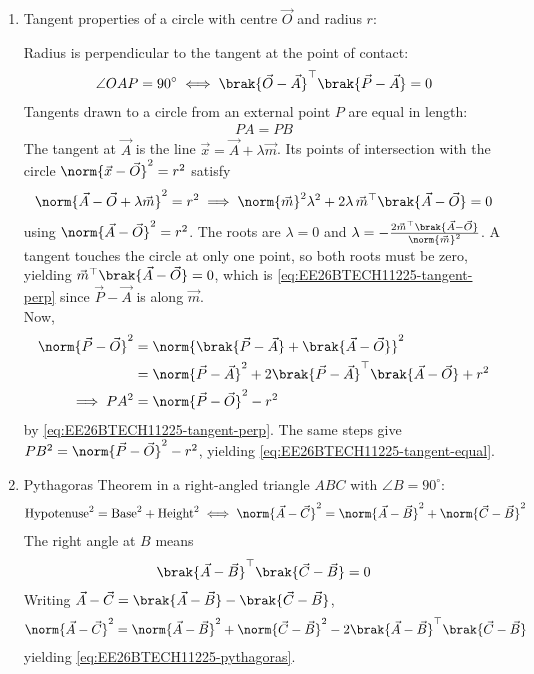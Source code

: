 \begin{enumerate}[label=\thesubsection.\arabic*, ref=\thesubsection.\theenumi]
\item Tangent properties of a circle with centre $\vec{O}$ and radius $r$:
\begin{center}
	
\end{center}
Radius is perpendicular to the tangent at the point of contact:
\begin{align}
	\angle OAP = 90^\circ
	\iff \brak{\vec{O} - \vec{A}}^{\top}\brak{\vec{P} - \vec{A}} = 0
	\label{eq:EE26BTECH11225-tangent-perp}
\end{align}
Tangents drawn to a circle from an external point $P$ are equal in length:
\begin{align}
	PA = PB
	\label{eq:EE26BTECH11225-tangent-equal}
\end{align}
\solution
The tangent at $\vec{A}$ is the line $\vec{x} = \vec{A} + \lambda\vec{m}$. Its points of intersection with the circle $\norm{\vec{x} - \vec{O}}^2 = r^2$ satisfy
\begin{align}
	\norm{\vec{A} - \vec{O} + \lambda\vec{m}}^2 = r^2
	\implies \norm{\vec{m}}^2\lambda^2 + 2\lambda\,\vec{m}^{\top}\brak{\vec{A} - \vec{O}} = 0
\end{align}
using $\norm{\vec{A} - \vec{O}}^2 = r^2$. The roots are $\lambda = 0$ and $\lambda = -\frac{2\vec{m}^{\top}\brak{\vec{A} - \vec{O}}}{\norm{\vec{m}}^2}$. A tangent touches the circle at only one point, so both roots must be zero, yielding
$\vec{m}^{\top}\brak{\vec{A} - \vec{O}} = 0$, which is \eqref{eq:EE26BTECH11225-tangent-perp} since $\vec{P} - \vec{A}$ is along $\vec{m}$.
\\
Now,
\begin{align}
	\norm{\vec{P} - \vec{O}}^2
	&= \norm{\brak{\vec{P} - \vec{A}} + \brak{\vec{A} - \vec{O}}}^2
	\\
	&= \norm{\vec{P} - \vec{A}}^2 + 2\brak{\vec{P} - \vec{A}}^{\top}\brak{\vec{A} - \vec{O}} + r^2
	\\
	\implies PA^2 &= \norm{\vec{P} - \vec{O}}^2 - r^2
\end{align}
by \eqref{eq:EE26BTECH11225-tangent-perp}. The same steps give $PB^2 = \norm{\vec{P} - \vec{O}}^2 - r^2$, yielding \eqref{eq:EE26BTECH11225-tangent-equal}.

\item Pythagoras Theorem in a right-angled triangle $ABC$ with $\angle B = 90^\circ$:
\begin{align}
	\text{Hypotenuse}^2 = \text{Base}^2 + \text{Height}^2
	\iff
	\norm{\vec{A} - \vec{C}}^2 = \norm{\vec{A} - \vec{B}}^2 + \norm{\vec{C} - \vec{B}}^2
	\label{eq:EE26BTECH11225-pythagoras}
\end{align}
\solution
The right angle at $B$ means
\begin{align}
	\brak{\vec{A} - \vec{B}}^{\top}\brak{\vec{C} - \vec{B}} = 0
\end{align}
Writing $\vec{A} - \vec{C} = \brak{\vec{A} - \vec{B}} - \brak{\vec{C} - \vec{B}}$,
\begin{align}
	\norm{\vec{A} - \vec{C}}^2
	= \norm{\vec{A} - \vec{B}}^2 + \norm{\vec{C} - \vec{B}}^2 - 2\brak{\vec{A} - \vec{B}}^{\top}\brak{\vec{C} - \vec{B}}
\end{align}
yielding \eqref{eq:EE26BTECH11225-pythagoras}.


\end{enumerate}
